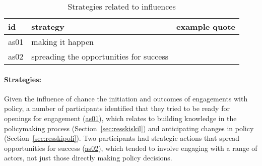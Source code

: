 \begin{table}[!ht]
\footnotesize
\caption{Strategies related to \skiagen{} influences}\label{tab:resskiagenstrat}
\begin{tabular}{L{.06\linewidth}L{.3\linewidth}L{.64\linewidth}} \hline
\textbf{id} & \textbf{strategy} & \textbf{example quote} \\ \hline \hline
as01 & making it happen &  \\[5mm]
as02 & spreading the opportunities for success &  \\[5mm]
\hline
 \end{tabular}
\end{table}

\paragraph{Strategies:}
Given the influence of chance the initiation and outcomes of engagements with policy, a number of participants identified that they tried to be ready for openings for engagement (\hyperref[tab:resskiagenstrat]{as01}), which relates to building knowledge in the policymaking process (Section~\ref{sec:resskiskil}) and anticipating changes in policy (Section~\ref{sec:resskipoli}). Two participants had strategic actions that spread opportunities for success (\hyperref[tab:resskiagenstrat]{as02}), which tended to involve engaging with a range of actors, not just those directly making policy decisions.

\subsubsection{\titpers}\label{sec:resskipers}

